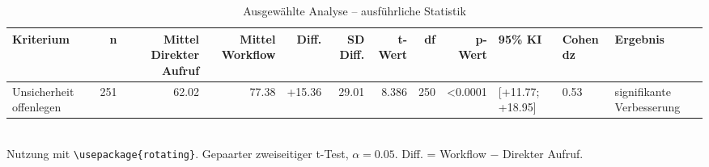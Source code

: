 \begin{table}
\centering
\caption{Ausgewählte Analyse -- ausführliche Statistik}
\begin{tabular}{lrrrrrrrrlll}
\toprule
Kriterium & n & Mittel Direkter Aufruf & Mittel Workflow & Diff. & SD Diff. & t-Wert & df & p-Wert & 95\% KI & Cohen dz & Ergebnis \\
\midrule
Unsicherheit offenlegen & 251 & 62.02 & 77.38 & +15.36 & 29.01 & 8.386 & 250 & <0.0001 & [+11.77; +18.95] & 0.53 & signifikante Verbesserung \\
\bottomrule
\end{tabular}
\\[2mm]
\footnotesize Nutzung mit \texttt{\textbackslash usepackage\{rotating\}}. Gepaarter zweiseitiger t-Test, $\alpha=0.05$. Diff. = Workflow $-$ Direkter Aufruf.
\end{table}
